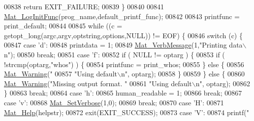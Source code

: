 \begin{DoxyCode}
{{{{{{{{{{{{{{{{{{{{{{{{{{{{{{{{{{{{{{{{{{{{{{00838         \textcolor{keywordflow}{return} EXIT\_FAILURE;
00839     \}
00840 
00841     \hyperlink{group__mat__util_ga93f4dd8d36413ae7f49260d757e3ab9f}{Mat\_LogInitFunc}(prog\_name,default\_printf\_func);
00842 
00843     printfunc = print\_default;
00844 
00845     \textcolor{keywordflow}{while} ((c = getopt\_long(argc,argv,optstring,options,NULL)) != EOF) \{
00846         \textcolor{keywordflow}{switch} (c) \{
00847             \textcolor{keywordflow}{case} \textcolor{charliteral}{'d'}:
00848                 printdata = 1;
00849                 \hyperlink{group__mat__util_ga64a176ea7e27e38d4242a24f3e3bad24}{Mat\_VerbMessage}(1,\textcolor{stringliteral}{"Printing data\(\backslash\)n"});
00850                 \textcolor{keywordflow}{break};
00851             \textcolor{keywordflow}{case} \textcolor{charliteral}{'f'}:
00852                 \textcolor{keywordflow}{if} ( NULL != optarg ) \{
00853                     \textcolor{keywordflow}{if} ( !strcmp(optarg,\textcolor{stringliteral}{"whos"}) ) \{
00854                         printfunc = print\_whos;
00855                     \} \textcolor{keywordflow}{else} \{
00856                         \hyperlink{group__mat__util_gafcedc83eb7e4759a8ea5c974c4f801c3}{Mat\_Warning}(\textcolor{stringliteral}{"%
00857                               \textcolor{stringliteral}{"Using default\(\backslash\)n"}, optarg);
00858                     \}
00859                 \} \textcolor{keywordflow}{else} \{
00860                     \hyperlink{group__mat__util_gafcedc83eb7e4759a8ea5c974c4f801c3}{Mat\_Warning}(\textcolor{stringliteral}{"Missing output format. "}
00861                             \textcolor{stringliteral}{"Using default\(\backslash\)n"}, optarg);
00862                 \}
00863                 \textcolor{keywordflow}{break};
00864             \textcolor{keywordflow}{case} \textcolor{charliteral}{'h'}:
00865                 human\_readable = 1;
00866                 \textcolor{keywordflow}{break};
00867             \textcolor{keywordflow}{case} \textcolor{charliteral}{'v'}:
00868                 \hyperlink{group__mat__util_gaf348b811ee26bfc923924878cea3c9ba}{Mat\_SetVerbose}(1,0);
00869                 \textcolor{keywordflow}{break};
00870             \textcolor{keywordflow}{case} \textcolor{charliteral}{'H'}:
00871                 \hyperlink{group__mat__util_gaa4039c185e807ed2e9682b66fe2ea331}{Mat\_Help}(helpstr);
00872                 exit(EXIT\_SUCCESS);
00873             \textcolor{keywordflow}{case} \textcolor{charliteral}{'V'}:
00874                 printf(\textcolor{stringliteral}{"%
}}}}}}}}}}}}}}}}}}}}}}}}}}}}}}}}}}}}}}}}}}}}}}}}
\end{DoxyCode}
